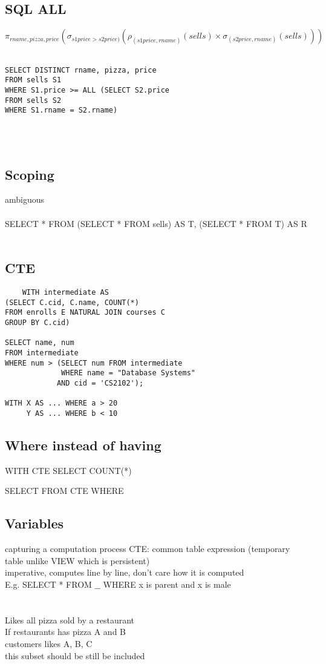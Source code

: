 \documentclass[11pt]{article}
\begin{document}
    \subsection*{SQL ALL}
      $\pi_{rname, pizza, price} ( \sigma_{s1price > s2price)} (\rho_{(s1price, rname)}(sells)  \times \sigma_{(s2price, rname)}(sells) ))$
      \\\\
  \begin{verbatim}
SELECT DISTINCT rname, pizza, price
FROM sells S1
WHERE S1.price >= ALL (SELECT S2.price
FROM sells S2 
WHERE S1.rname = S2.rname)

    \end{verbatim}\\\\
 \subsection*{Scoping}
 ambiguous\\
 \\
SELECT *
FROM (SELECT * FROM sells) AS T,
(SELECT * FROM T) AS R
\\
\\
\subsection*{CTE}
\begin{verbatim}
	WITH intermediate AS
(SELECT C.cid, C.name, COUNT(*)
FROM enrolls E NATURAL JOIN courses C
GROUP BY C.cid)

SELECT name, num
FROM intermediate
WHERE num > (SELECT num FROM intermediate 
             WHERE name = "Database Systems"
            AND cid = 'CS2102');
            
WITH X AS ... WHERE a > 20
	 Y AS ... WHERE b < 10
	\end{verbatim} 
\subsection*{Where instead of having}
WITH CTE
SELECT COUNT(*)

SELECT FROM CTE
WHERE

\subsection*{Variables}
capturing a computation process
CTE: common table expression (temporary table unlike VIEW which is persistent)
\\
imperative, computes line by line, don't care how it is computed\\
E.g. SELECT * FROM $\_\_$ WHERE x is parent and x is male \\
\\
\\
Likes all pizza sold by a restaurant\\
If restaurants has pizza A and B\\
customers likes A, B, C\\
this subset should be still be included
\end{document}
